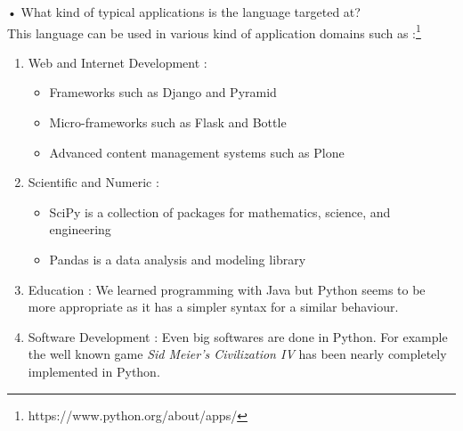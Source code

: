 
•	What kind of typical applications is the language targeted at?\\
This language can be used in various kind of application domains such as :\footnote{https://www.python.org/about/apps/}
\begin{enumerate}
    \item{Web and Internet Development : 
        \begin{itemize}
            \item Frameworks such as Django and Pyramid
            \item Micro-frameworks such as Flask and Bottle
            \item Advanced content management systems such as Plone
        \end{itemize}
    }
    \item{Scientific and Numeric :
        \begin{itemize}
            \item SciPy is a collection of packages for mathematics, science, and engineering
            \item Pandas is a data analysis and modeling library
        \end{itemize}
    
    }
    \item{Education : We learned programming with Java but Python seems to be more appropriate as it has a simpler syntax for a similar behaviour.}
    \item{Software Development : Even big softwares are done in Python. For example the well known game \emph{Sid Meier's Civilization IV} has been nearly completely implemented in Python.}
\end{enumerate}